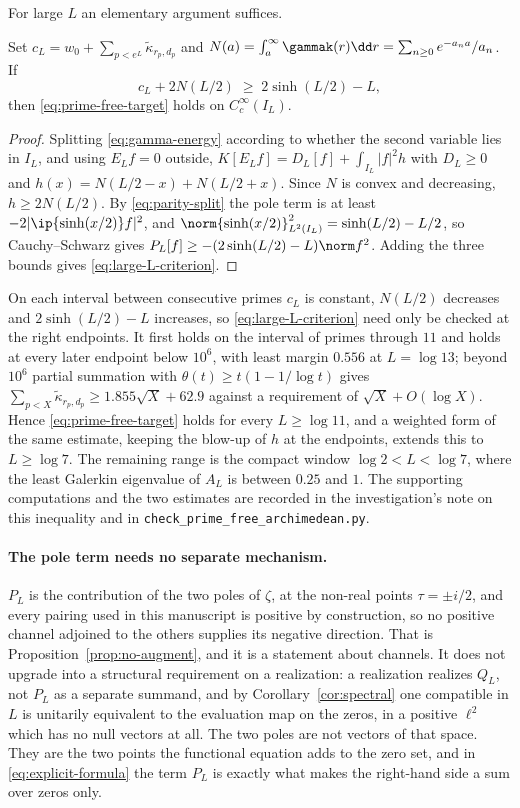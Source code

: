 For large $L$ an elementary argument suffices.

\begin{proposition}\label{prop:prime-free-large-L}
Set $c_L=w_0+\sum_{p<e^L}\widetilde\kappa_{r_p,d_p}$ and
$N(a)=\int_a^\infty\gammak(r)\dd r=\sum_{n\geq0}e^{-a_na}/a_n$. If
\begin{equation}\label{eq:large-L-criterion}
 c_L+2N(L/2)\;\geq\;2\sinh(L/2)-L,
\end{equation}
then \eqref{eq:prime-free-target} holds on $C_c^\infty(I_L)$.
\end{proposition}
\begin{proof}
Splitting \eqref{eq:gamma-energy} according to whether the second variable lies
in $I_L$, and using $E_Lf=0$ outside,
$K[E_Lf]=D_L[f]+\int_{I_L}|f|^2h$ with $D_L\geq0$ and
$h(x)=N(L/2-x)+N(L/2+x)$. Since $N$ is convex and decreasing,
$h\geq2N(L/2)$. By \eqref{eq:parity-split} the pole term is at least
$-2|\ip{\sinh(x/2)}f|^2$, and
$\norm{\sinh(x/2)}_{L^2(I_L)}^2=\sinh(L/2)-L/2$, so Cauchy--Schwarz gives
$P_L[f]\geq-(2\sinh(L/2)-L)\norm f^2$. Adding the three bounds gives
\eqref{eq:large-L-criterion}.
\end{proof}

On each interval between consecutive primes $c_L$ is constant, $N(L/2)$
decreases and $2\sinh(L/2)-L$ increases, so \eqref{eq:large-L-criterion} need
only be checked at the right endpoints. It first holds on the interval of
primes through $11$ and holds at every later endpoint below $10^6$, with least
margin $0.556$ at $L=\log13$; beyond $10^6$ partial summation with
$\theta(t)\geq t(1-1/\log t)$ gives
$\sum_{p<X}\widetilde\kappa_{r_p,d_p}\geq1.855\sqrt X+62.9$ against a
requirement of $\sqrt X+O(\log X)$. Hence \eqref{eq:prime-free-target} holds
for every $L\geq\log11$, and a weighted form of the same estimate, keeping the
blow-up of $h$ at the endpoints, extends this to $L\geq\log7$. The remaining
range is the compact window $\log2<L<\log7$, where the least Galerkin
eigenvalue of $A_L$ is between $0.25$ and $1$. The supporting computations and
the two estimates are recorded in the investigation's note on this inequality
and in \texttt{check\_prime\_free\_archimedean.py}.

\paragraph{The pole term needs no separate mechanism.}
$P_L$ is the contribution of the two poles of $\zeta$, at the non-real points
$\tau=\pm i/2$, and every pairing used in this manuscript is positive by
construction, so no positive channel adjoined to the others supplies its
negative direction. That is Proposition~\ref{prop:no-augment}, and it is a
statement about channels. It does not upgrade into a structural requirement on
a realization: a realization realizes $Q_L$, not $P_L$ as a separate summand,
and by Corollary~\ref{cor:spectral} one compatible in $L$ is unitarily
equivalent to the evaluation map on the zeros, in a positive $\ell^2$ which has
no null vectors at all. The two poles are not vectors of that space. They are
the two points the functional equation adds to the zero set, and in
\eqref{eq:explicit-formula} the term $P_L$ is exactly what makes the right-hand
side a sum over zeros only.

